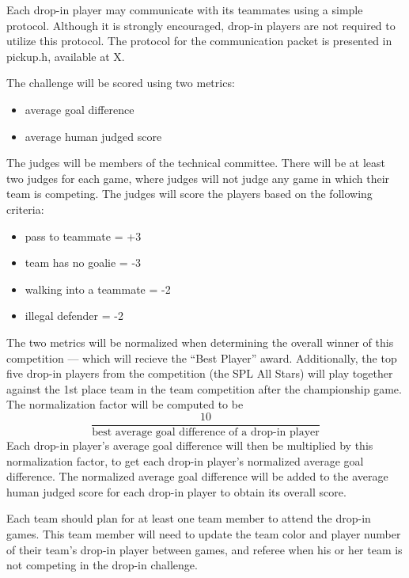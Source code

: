 \documentclass[12pt]{article}
\begin{document}
Each drop-in player may communicate with its teammates using a simple protocol.  Although it is strongly encouraged, drop-in players are not required to utilize this protocol.  The protocol for the communication packet is presented in pickup.h, available at X. 

The challenge will be scored using two metrics: 
\begin{itemize}
\item average goal difference
\item average human judged score
\end{itemize}

The judges will be members of the technical committee.  There will be at least two judges for each game, where judges will not judge any game in which their team is competing.  The judges will score the players based on the following criteria:
\begin{itemize}
\item pass to teammate = +3
\item team has no goalie = -3
\item walking into a teammate = -2
\item illegal defender = -2
\end{itemize}

The two metrics will be normalized when determining the overall winner of this competition --- which will recieve the ``Best Player'' award.  Additionally, the top five drop-in players from the competition (the SPL All Stars) will play together against the 1st place team in the team competition after the championship game.  The normalization factor will be computed to be \[\frac{10}{\text{best average goal difference of a drop-in player}}\]
Each drop-in player's average goal difference will then be multiplied by this normalization factor, to get each drop-in player's normalized average goal difference.  The normalized average goal difference will be added to the average human judged score for each drop-in player to obtain its overall score.

Each team should plan for at least one team member to attend the drop-in games.  This team member will need to update the team color and player number of their team's drop-in player between games, and referee when his or her team is not competing in the drop-in challenge. 
\end{document}
